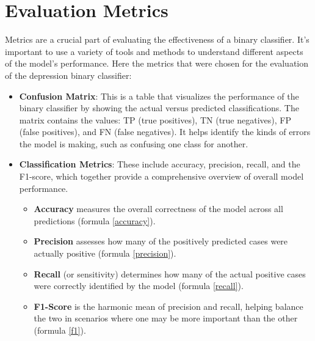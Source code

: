 \section{Evaluation Metrics}
\quad Metrics are a crucial part of evaluating the effectiveness of a binary classifier. It's important to use a variety of tools and methods to understand different aspects of the model's performance. Here the metrics that were chosen for the evaluation of the depression binary classifier:

\begin{itemize}
     \item \textbf{Confusion Matrix}: This is a table that visualizes the performance of the binary classifier by showing the actual versus predicted classifications. The matrix contains the values: TP (true positives), TN (true negatives), FP (false positives), and FN (false negatives). It helps identify the kinds of errors the model is making, such as confusing one class for another.
     
    \item \textbf{Classification Metrics}: These include accuracy, precision, recall, and the F1-score, which together provide a comprehensive overview of overall model performance. 
    \begin{itemize}
        \item \textbf{Accuracy} measures the overall correctness of the model across all predictions (formula \ref{accuracy}). 
        \item \textbf{Precision} assesses how many of the positively predicted cases were actually positive 
 (formula \ref{precision}).
        \item \textbf{Recall} (or sensitivity) determines how many of the actual positive cases were correctly identified by the model (formula \ref{recall}).
        \item \textbf{F1-Score} is the harmonic mean of precision and recall, helping balance the two in scenarios where one may be more important than the other 
 (formula \ref{f1}).
        

\end{itemize}
\end{itemize}
